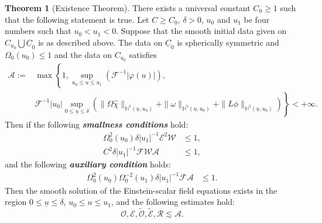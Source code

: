 \documentclass[11pt,reqno]{amsart}
\theoremstyle{definition}
\newtheorem{theorem}{Theorem}[section]
\numberwithin{equation}{section}
\renewcommand{\H}{\mathbb{H}}
\def\chih{\widehat{\chi}}
\def\ub{\underline{u}}
\def\Cb{\underline{C}}
\begin{document}
 \begin{theorem}[Existence Theorem]\label{existencetheorem}
There exists a universal constant $C_0\ge1$ such that the following statement is true. Let $C\ge C_0$, $\delta>0$, $u_0$ and $u_1$ be four numbers such that $u_0<u_1<0$. Suppose that the smooth initial data given on $C_{u_0}\bigcup \Cb_0$ is as described above. The data on $\Cb_0$ is spherically symmetric and $\Omega_0(u_0)\le1$ and the data on $C_{u_0}$ satisfies
 \begin{equation}\label{def-A}
 \begin{split}
 \mathcal{A}:=&\max\left\{1,\sup_{u_0\le u\le u_1}\left(\mathscr{F}^{-1}|\varphi(u)|\right),\right.\\
 &\left.\mathscr{F}^{-1}|u_0|\sup_{0\le\ub\le\delta}\left(\|\Omega\chih\|_{\H^7(\ub,u_0)}+\|\omega\|_{\H^5(\ub,u_0)}+\|L\phi\|_{\H^5(\ub,u_0)}\right)\right\}<+\infty.
 \end{split}
 \end{equation}
 Then if the following {\bf{\emph{smallness conditions}}} hold:
\begin{equation}\label{smallness}
\begin{split}
\Omega_0^2(u_0)\delta|u_1|^{-1}\mathscr{E}^2\mathscr{W}&\le 1,\\
 C^2\delta|u_1|^{-1}\mathscr{F}\mathscr{W}\mathcal{A}&\le 1,
\end{split}
\end{equation}
and the following {\bf \emph{auxiliary condition}} holds:
\begin{equation}\label{auxiliary}
\begin{split}
\Omega_0^2(u_0)\Omega_0^{-2}(u_1)\delta|u_1|^{-1}\mathscr{F}\mathcal{A}&\le 1.
\end{split}
\end{equation}
Then the smooth solution of the Einstein-scalar field equations exists in the region $0\le\ub\le\delta$, $u_0\le u\le u_1$, and the following estimates hold:
$$\mathcal{O}, \mathcal{E}, \widetilde{\mathcal{O}}, \widetilde{\mathcal{E}}, \mathcal{R}\lesssim \mathcal{A}.$$
 \end{theorem}
\end{document}

